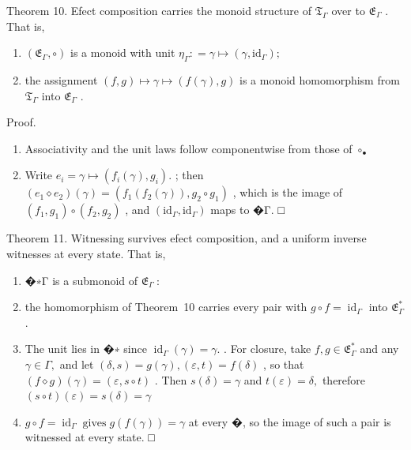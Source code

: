 \documentclass[
  10
]{article}
\begin{document}
Theorem 10. Efect composition carries the monoid structure of
\(\mathfrak { T } _ { \Gamma }\) over to
\(\mathfrak { E } _ { \Gamma }\) . That is,

\begin{enumerate}
\def\labelenumi{\arabic{enumi}.}
\item
  \(( { \mathfrak { E } } _ { \Gamma } , \circ )\) is a monoid with unit
  \(\eta _ { \Gamma } : = \gamma \mapsto ( \gamma , \mathrm { i d } _ { \Gamma } ) ;\)
\item
  the assignment
  \(( f , g ) \mapsto \gamma \mapsto ( f ( \gamma ) , g )\) is a monoid
  homomorphism from \(\mathfrak { T } _ { \Gamma }\) into
  \(\mathfrak { E } _ { \Gamma }\) .
\end{enumerate}

Proof.

\begin{enumerate}
\def\labelenumi{\arabic{enumi}.}
\item
  Associativity and the unit laws follow componentwise from those of
  \(\circ _ { \bullet }\)
\item
  Write
  \(e _ { i } = \gamma \mapsto ( f _ { i } ( \gamma ) , g _ { i } ) .\)
  ; then
  \(( e _ { 1 } \diamond e _ { 2 } ) ( \gamma ) = ( f _ { 1 } ( f _ { 2 } ( \gamma ) ) , g _ { 2 } \circ g _ { 1 } )\)
  , which is the image of
  \(\left( f _ { 1 } , g _ { 1 } \right) \circ \left( f _ { 2 } , g _ { 2 } \right)\)
  , and
  \(( \mathrm { i d } _ { \Gamma } , \mathrm { i d } _ { \Gamma } )\)
  maps to �Γ. □
\end{enumerate}

Theorem 11. Witnessing survives efect composition, and a uniform inverse
witnesses at every state. That is,

\begin{enumerate}
\def\labelenumi{\arabic{enumi}.}
\item
  �∗Γ is a submonoid of \(\mathfrak { E } _ { \Gamma } \ :\)
\item
  the homomorphism of Theorem~10 carries every pair with
  \(g \circ f = \operatorname { i d } _ { \Gamma }\) into
  \({ \mathfrak { E } } _ { \Gamma } ^ { * }\) .
\item
  The unit lies in �∗ since
  \(\operatorname { i d } _ { \Gamma } ( \gamma ) = \gamma .\) . For
  closure, take \(f , g \in { \mathfrak { E } } _ { \Gamma } ^ { * }\)
  and any \(\gamma \in \Gamma ,\) and let
  \(( \delta , s ) = g ( \gamma ) , ( \varepsilon , t ) = f ( \delta )\)
  , so that
  \(( f \diamond g ) ( \gamma ) = ( \varepsilon , s \circ t )\) . Then
  \(s ( \delta ) = \gamma\) and \(t ( \varepsilon ) = \delta ,\)
  therefore \(( s \circ t ) ( \varepsilon ) = s ( \delta ) = \gamma\)
\item
  \(g \circ f = \operatorname { i d } _ { \Gamma } \operatorname { g i v e s } g ( f ( \gamma ) ) = \gamma\)
  at every �, so the image of such a pair is witnessed at every state. □
\end{enumerate}
\end{document}
